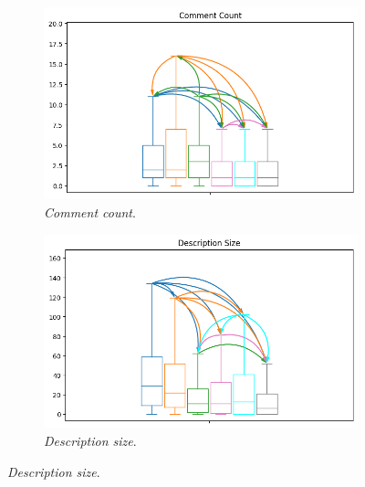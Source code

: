 \documentclass[10pt,a4paper,twocolumn]{article}
\begin{document}
\begin{figure}
    \begin{subfigure}{.4\textwidth}
      \centering
      \includegraphics[width=\linewidth]{rq2_mw/comment count_high_conf_plot_arrows.png}
      \caption{\textit{Comment count}.}
    \end{subfigure}
    \begin{subfigure}{.4\textwidth}
      \centering
      \includegraphics[width=\linewidth]{rq2_mw/description size_high_conf_plot_arrows.png}
      \caption{\textit{Description size}.}
    \end{subfigure}
    

\end{figure}
\end{document}
